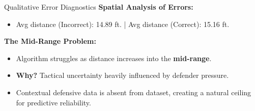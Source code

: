 \begin{frame}{Qualitative Error Diagnostics}
    \textbf{Spatial Analysis of Errors:}
    \begin{itemize}
        \item Avg distance (Incorrect): 14.89 ft. | Avg distance (Correct): 15.16 ft.
    \end{itemize}
    \vspace{0.3cm}
    \textbf{The Mid-Range Problem:}
    \begin{itemize}
        \item Algorithm struggles as distance increases into the \textbf{mid-range}.
        \item \textbf{Why?} Tactical uncertainty heavily influenced by defender pressure.
        \item Contextual defensive data is absent from dataset, creating a natural ceiling for predictive reliability.
    \end{itemize}
\end{frame}